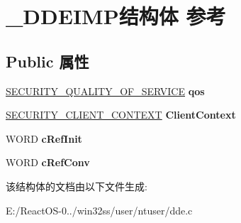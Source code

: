 \hypertarget{struct___d_d_e_i_m_p}{}\section{\+\_\+\+D\+D\+E\+I\+M\+P结构体 参考}
\label{struct___d_d_e_i_m_p}
\subsection*{Public 属性}
\begin{DoxyCompactItemize}
\item 
\mbox{\label{struct___d_d_e_i_m_p_a9a05713f7d461282fa28e36b152b2cd3}} 
\hyperlink{struct___s_e_c_u_r_i_t_y___q_u_a_l_i_t_y___o_f___s_e_r_v_i_c_e}{S\+E\+C\+U\+R\+I\+T\+Y\+\_\+\+Q\+U\+A\+L\+I\+T\+Y\+\_\+\+O\+F\+\_\+\+S\+E\+R\+V\+I\+CE} {\bfseries qos}
\item 
\mbox{\label{struct___d_d_e_i_m_p_a6af0b3eadb3913d7e1e66dbbaa612d6f}} 
\hyperlink{struct___s_e_c_u_r_i_t_y___c_l_i_e_n_t___c_o_n_t_e_x_t}{S\+E\+C\+U\+R\+I\+T\+Y\+\_\+\+C\+L\+I\+E\+N\+T\+\_\+\+C\+O\+N\+T\+E\+XT} {\bfseries Client\+Context}
\item 
\mbox{\label{struct___d_d_e_i_m_p_af52214ef70dab32683b9e1a3dba78afc}} 
W\+O\+RD {\bfseries c\+Ref\+Init}
\item 
\mbox{\label{struct___d_d_e_i_m_p_a6a7fc37b1009ceed830d9853bfb77ec0}} 
W\+O\+RD {\bfseries c\+Ref\+Conv}
\end{DoxyCompactItemize}


该结构体的文档由以下文件生成\+:\begin{DoxyCompactItemize}
\item 
E\+:/\+React\+O\+S-\/0../win32ss/user/ntuser/dde.\+c\end{DoxyCompactItemize}
